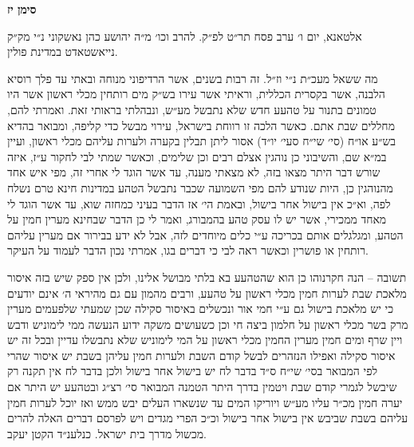 \documentclass[12pt, openany]{book}
\newcommand{\chapname}{}
\newcommand{\newchap}[1]{
	\addcontentsline{toc}{chapter}{#1}
	\renewcommand{\chapname}{#1}
		\begin{center}
			\textbf{%
\fontsize{16pt}{16pt}\selectfont
				#1}
		\end{center}
}
\begin{document}
\newchap{סימן יז}
\begin{multicols}{2}
אלטאנא, יום ו׳ ערב פסח תר״ט לפ״ק. להרב וכו׳ מ״ה יהושע כהן נאשקוני נ״י מק״ק נייאשטאדט במדינת פולין.\\\vspace{0pt}

מה ששאל מעכ״ת נ״י וז״ל. זה רבות בשנים, אשר הרדיפוני מנוחה ובאתי עד פלך רוסיא הלבנה, אשר בקסרית הכללית, וראיתי אשר עירו בש״ק מים רותחין מכלי ראשון אשר היו טמונים בתנור על טהעע חדש שלא נתבשל מע״ש, ונבהלתי בראותי זאת. ואמרתי להם, מחללים שבת אתם. כאשר הלכה זו רווחת בישראל, עירוי מבשל כדי קליפה, ומבואר בהדיא בש״ע או״ח (סי׳ שי״ח סעי׳ יו״ד) אסור ליתן תבלין בקערה ולערות עליהם מכלי ראשון, ועיין במ״א שם, והשיבוני כן נוהגין אצלם רבים וכן שלימים, וכאשר שמתי לבי לחקור ע״ז, איזה שורש דבר היתר מצאו בזה, לא מצאתי מענה, עד אשר הוגד לי אחרי זה, מפי איש אחד מהנוהגין כן, היות שנודע להם מפי השמועה שכבר נתבשל הטהע במדינות חינא טרם נשלח לפה, וא״כ אין בישול אחר בישול, ובאמת הי׳ אז הדבר בעיני כמחזה שוא, עד אשר הוגד לי מאחד ממכירי, אשר יש לו עסק טהע בהמבורג, ואמר לי כן הדבר שבחינא מערין חמין על הטהע, ומגלגלים אותם בכריכה ע״י כלים מיוחדים לזה, אבל לא ידע בבירור אם מערין עליהם רותחין או פושרין וכאשר ראה לבי כי דברים בגו, אמרתי נכון הדבר לעמוד על העיקר.\\\vspace{0pt}

תשובה – הנה חקרנוהו כן הוא שהטהעע בא בלתי מבושל אלינו, ולכן אין ספק שיש בזה איסור מלאכת שבת לערות חמין מכלי ראשון על טהעע, ורבים מהמון עם גם מהיראי ה׳ אינם יודעים כי יש מלאכת בישול גם ע״י חמי אור ונכשלים באיסור סקילה שכן שמעתי שלפעמים מערין מרק בשר מכלי ראשון על חלמון ביצה חי וכן כשעושים משקה ידוע הנעשה ממי לימוניש ודבש ויין שרף ומים חמין מערין החמין מכלי ראשון על המי לימוניש שלא נתבשלו עדיין ובכל זה יש איסור סקילה ואפילו הנזהרים לבשל קודם השבת ולערות חמין עליהן בשבת יש איסור שהרי לפי המבואר בסי׳ שי״ח ס״ד בדבר לח יש בישול אחר בישול ולכן בדבר לח אין תקנה רק שיבשל לגמרי קודם שבת ויטמין בדרך היתר הטמנה המבואר סי׳ רצ״ג ובטהעע יש היתר אם יערה חמין מכ״ר עליו מע״ש ויוריקו המים עד שנשארו העלים יבש ממש ואז יוכל לערות חמין עליהם בשבת שביבש אין בישול אחר בישול וכ״כ הפרי מגדים ויש לפרסם דברים האלה להרים מכשול מדרך בית ישראל. כנלענ״ד הקטן יעקב.\\\vspace{0pt}

\end{multicols}\newpage
\end{document}
